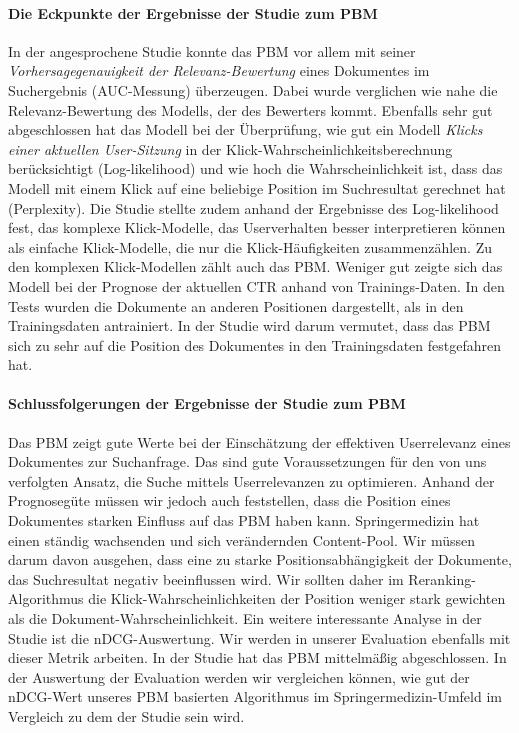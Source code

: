 \paragraph{Die Eckpunkte der Ergebnisse der Studie zum PBM}
In der angesprochene Studie \cite{pbm} konnte das PBM vor allem mit seiner \textit{Vorhersagegenauigkeit der Relevanz-Bewertung} eines Dokumentes im Suchergebnis (AUC-Messung) überzeugen. Dabei wurde verglichen wie nahe die Relevanz-Bewertung des Modells, der des Bewerters kommt. Ebenfalls sehr gut abgeschlossen hat das Modell bei der Überprüfung, wie gut ein Modell \textit{Klicks einer aktuellen User-Sitzung} in der Klick-Wahrscheinlichkeitsberechnung berücksichtigt (Log-likelihood) und wie hoch die Wahrscheinlichkeit ist, dass das Modell mit einem Klick auf eine beliebige Position im Suchresultat gerechnet hat (Perplexity). Die Studie stellte zudem anhand der Ergebnisse des Log-likelihood fest, das komplexe Klick-Modelle, das Userverhalten besser interpretieren können als einfache Klick-Modelle, die nur die Klick-Häufigkeiten zusammenzählen. Zu den komplexen Klick-Modellen zählt auch das PBM. Weniger gut zeigte sich das Modell bei der Prognose der aktuellen CTR anhand von Trainings-Daten. In den Tests wurden die Dokumente an anderen Positionen dargestellt, als in den Trainingsdaten antrainiert. In der Studie wird darum vermutet, dass das PBM sich zu sehr auf die Position des Dokumentes in den Trainingsdaten festgefahren hat.

\paragraph{Schlussfolgerungen der Ergebnisse der Studie zum PBM}
Das PBM zeigt gute Werte bei der Einschätzung der effektiven Userrelevanz eines Dokumentes zur Suchanfrage. Das sind gute Voraussetzungen für den von uns verfolgten Ansatz, die Suche mittels Userrelevanzen zu optimieren. Anhand der Prognosegüte müssen wir jedoch auch feststellen, dass die Position eines Dokumentes starken Einfluss auf das PBM haben kann. Springermedizin hat einen ständig wachsenden und sich verändernden Content-Pool. Wir müssen darum davon ausgehen, dass eine zu starke Positionsabhängigkeit der Dokumente, das Suchresultat negativ beeinflussen wird. Wir sollten daher im Reranking-Algorithmus die Klick-Wahrscheinlichkeiten der Position weniger stark gewichten als die Dokument-Wahrscheinlichkeit. Ein weitere interessante Analyse in der Studie ist die nDCG-Auswertung. Wir werden in unserer Evaluation ebenfalls mit dieser Metrik arbeiten. In der Studie hat das PBM mittelmäßig abgeschlossen. In der Auswertung der Evaluation werden wir vergleichen können, wie gut der nDCG-Wert unseres PBM basierten Algorithmus im Springermedizin-Umfeld im Vergleich zu dem der Studie sein wird.

